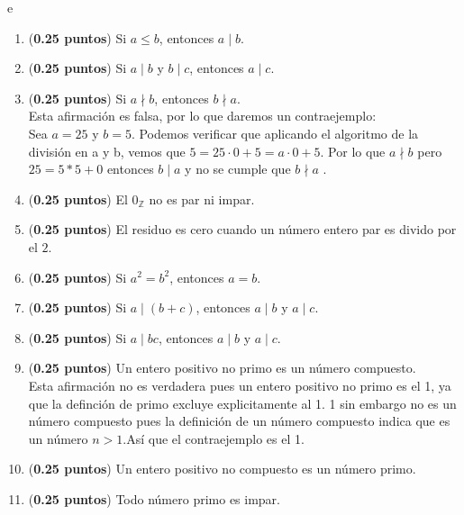 e\documentclass[fontsize=12pt]{scrartcl}
\begin{document}
\begin{enumerate}
		\item ({\bf 0.25 puntos})
		Si $a \leq b$, entonces $a\mid b$.
		
		\item ({\bf 0.25 puntos})
		Si $a \mid b$ y $b \mid c$, entonces $a \mid c$.

		\item ({\bf 0.25 puntos})
		  Si $a \nmid b$, entonces $b \nmid a$. \\
                  Esta afirmación es falsa, por lo que daremos un contraejemplo: \\
                  Sea $a=25$ y  $b=5$. Podemos verificar que aplicando el algoritmo de la división en a y b, vemos que $5 = 25 \cdot 0 + 5 = a \cdot 0 +5 $. Por lo que $a \nmid b$ pero $25 = 5 * 5 +0$ entonces $b \mid a$ y no se cumple que  $b \nmid a$ .
		
		\item ({\bf 0.25 puntos})
		El $0_{\mathbb{Z}}$ no es par ni impar.
		
		\item ({\bf 0.25 puntos})
		El residuo es cero cuando un n\'umero entero par es divido por el $2$.
		
		\item ({\bf 0.25 puntos})
		Si $a^{2} = b^{2}$, entonces $a = b$.
		
		\item ({\bf 0.25 puntos})
		Si $a \mid (b + c)$, entonces $a \mid b$ y $a \mid c$.
		
		\item ({\bf 0.25 puntos})
		Si $a \mid bc$, entonces $a \mid b$ y $a \mid c$.

		\item ({\bf 0.25 puntos})
		  Un entero positivo no primo es un n\'umero compuesto.\\
                  
                 Esta afirmación no es verdadera pues un entero positivo no primo es el 1, ya que la definción de primo excluye explicitamente al 1. 1 sin embargo no es un número compuesto pues la definición de un número compuesto indica que es un número $n>1$.Así que el contraejemplo es el 1.
		
		\item ({\bf 0.25 puntos})
		Un entero positivo no compuesto es un n\'umero primo.
		
		\item ({\bf 0.25 puntos})
		Todo n\'umero primo es impar.


\end{enumerate}
\end{document}
